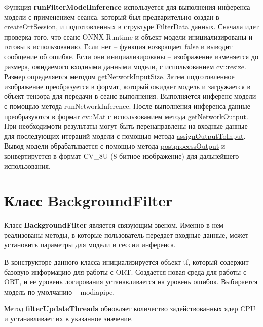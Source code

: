 \documentclass[a4paper,14pt]{extreport}
\begin{document}
        Функция \hypertarget{runFilter}{}\textbf{runFilterModelInference} используется для выполнения инференса модели с применением сеанса, который был предварительно создан в \hyperlink{createOrt}{createOrtSession}, и подготовленных в структуре FilterData данных. Сначала идет проверка того, что сеанс ONNX Runtime и объект модели инициализированы и готовы к использованию. Если нет -- функция возвращает false и выводит сообщение об ошибке. Если они инициализированы -- изображение изменяется до размера, ожидаемого входными данными модели, с использованием cv::resize. Размер определяется методом \hyperlink{getSize}{getNetworkInputSize}. Затем подготовленное изображение преобразуется в формат, который ожидает модель и загружается в объект тензора для передачи в сеанс выполнения. Выполняется инференс модели с помощью метода \hyperlink{runInference}{runNetworkInference}. После выполнения инференса данные преобразуются в формат cv::Mat с использованием метода \hyperlink{getOutput}{getNetworkOutput}. При необходимоти результаты могут быть перенаправлены на входные данные для последующих итераций модели с помощью метода \hyperlink{assign}{assignOutputToInput}. Вывод модели обрабатывается с помощью метода \hyperlink{postprocess}{postprocessOutput} и конвертируется в формат CV\_8U (8-битное изображение) для дальнейшего использования.
        

        \section{Класс BackgroundFilter}
        Класс \textbf{BackgroundFilter} является связующим звеном. Именно в нем реализованы методы, в которые пользователь передает входные данные, может установить параметры для модели и сессии инференса.
        

        В конструкторе данного класса инициализируется объект tf, который содержит базовую информацию для работы с ORT. Создается новая среда для работы с ORT, и ее уровень логирования устанавливается на уровень ошибок. Выбирается модель по умолчанию -- modiapipe.

        Метод \textbf{filterUpdateThreads} обновляет количество задействованных ядер CPU и устанавливает их в указанное значение.
        
\end{document}
